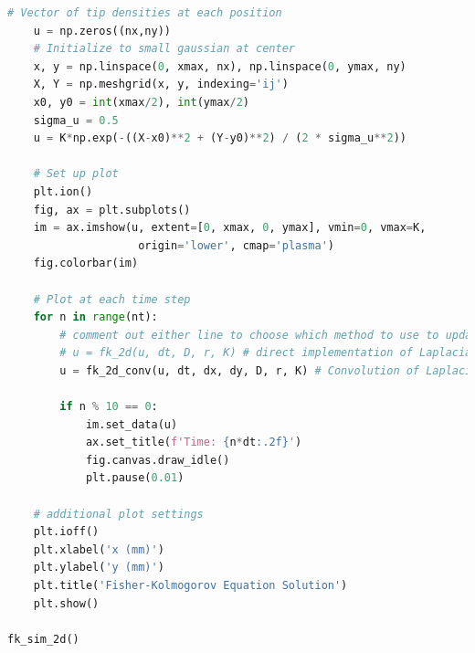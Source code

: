 \documentclass{article}
\begin{document}
\begin{lstlisting}[language=Python, caption=2D Fisher Kolmogorov Code]
    # Vector of tip densities at each position
    u = np.zeros((nx,ny))
    # Initialize to small gaussian at center
    x, y = np.linspace(0, xmax, nx), np.linspace(0, ymax, ny)
    X, Y = np.meshgrid(x, y, indexing='ij')
    x0, y0 = int(xmax/2), int(ymax/2)
    sigma_u = 0.5 
    u = K*np.exp(-((X-x0)**2 + (Y-y0)**2) / (2 * sigma_u**2))
    
    # Set up plot
    plt.ion()
    fig, ax = plt.subplots()
    im = ax.imshow(u, extent=[0, xmax, 0, ymax], vmin=0, vmax=K, 
                    origin='lower', cmap='plasma')
    fig.colorbar(im)
 
    # Plot at each time step
    for n in range(nt):
        # comment out either line to choose which method to use to update u
        # u = fk_2d(u, dt, D, r, K) # direct implementation of Laplacian formula
        u = fk_2d_conv(u, dt, dx, dy, D, r, K) # Convolution of Laplacian kernel
    
        if n % 10 == 0:
            im.set_data(u)
            ax.set_title(f'Time: {n*dt:.2f}')
            fig.canvas.draw_idle()
            plt.pause(0.01)

    # additional plot settings
    plt.ioff()
    plt.xlabel('x (mm)')
    plt.ylabel('y (mm)')
    plt.title('Fisher-Kolmogorov Equation Solution')
    plt.show()

fk_sim_2d()
\end{lstlisting}
\end{document}
